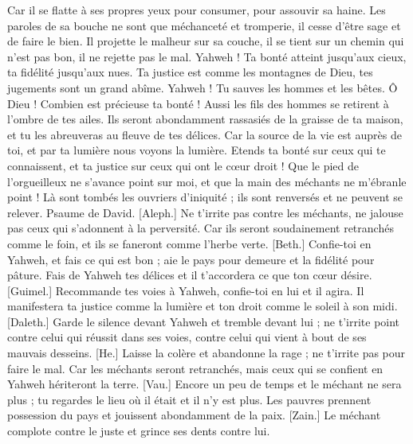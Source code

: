 \begin{multicols}{2}
Car il se flatte à ses propres yeux pour consumer, pour assouvir sa haine.
Les paroles de sa bouche ne sont que méchanceté et tromperie, il cesse d’être sage et de faire le bien.
Il projette le malheur sur sa couche, il se tient sur un chemin qui n'est pas bon, il ne rejette pas le mal.
Yahweh ! Ta bonté atteint jusqu'aux cieux, ta fidélité jusqu'aux nues.
Ta justice est comme les montagnes de Dieu, tes jugements sont un grand abîme. Yahweh ! Tu sauves les hommes et les bêtes.
Ô Dieu ! Combien est précieuse ta bonté ! Aussi les fils des hommes se retirent à l'ombre de tes ailes.
Ils seront abondamment rassasiés de la graisse de ta maison, et tu les abreuveras au fleuve de tes délices.
Car la source de la vie est auprès de toi, et par ta lumière nous voyons la lumière.
Etends ta bonté sur ceux qui te connaissent, et ta justice sur ceux qui ont le cœur droit !
Que le pied de l'orgueilleux ne s'avance point sur moi, et que la main des méchants ne m'ébranle point !
Là sont tombés les ouvriers d'iniquité ; ils sont renversés et ne peuvent se relever.
\VerseOne{}Psaume de David. [Aleph.] Ne t’irrite pas contre les méchants, ne jalouse pas ceux qui s'adonnent à la perversité.
Car ils seront soudainement retranchés comme le foin, et ils se faneront comme l'herbe verte.
[Beth.] Confie-toi en Yahweh, et fais ce qui est bon ; aie le pays pour demeure et la fidélité pour pâture.
Fais de Yahweh tes délices et il t'accordera ce que ton cœur désire.
[Guimel.] Recommande tes voies à Yahweh, confie-toi en lui et il agira.
Il manifestera ta justice comme la lumière et ton droit comme le soleil à son midi.
[Daleth.] Garde le silence devant Yahweh et tremble devant lui ; ne t’irrite point contre celui qui réussit dans ses voies, contre celui qui vient à bout de ses mauvais desseins.
[He.] Laisse la colère et abandonne la rage ; ne t’irrite pas pour faire le mal.
Car les méchants seront retranchés, mais ceux qui se confient en Yahweh hériteront la terre.
[Vau.] Encore un peu de temps et le méchant ne sera plus ; tu regardes le lieu où il était et il n'y est plus.
Les pauvres prennent possession du pays et jouissent abondamment de la paix.
[Zain.] Le méchant complote contre le juste et grince ses dents contre lui.

\end{multicols}
